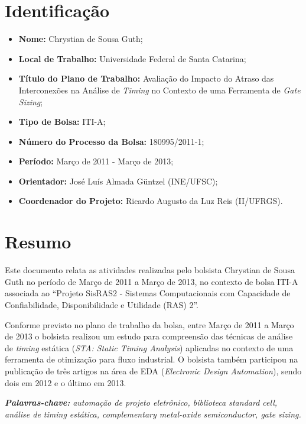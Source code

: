 \documentclass[
	12pt,				%
	openright,			%
	twoside,			%
	a4paper,			%
	english,			%
	french,				%
	spanish,			%
	brazil,				%
	]{abntex2}
\begin{document}
\section{Identificação}

\begin{itemize}
	\item \textbf{Nome:} Chrystian de Sousa Guth;
	\item \textbf{Local de Trabalho:} Universidade Federal de Santa Catarina;
	\item \textbf{Título do Plano de Trabalho:} Avaliação do Impacto do Atraso das Interconexões na Análise de \textit{Timing} no Contexto de uma Ferramenta de \textit{Gate Sizing};
	\item \textbf{Tipo de Bolsa:} ITI-A;
	\item \textbf{Número do Processo da Bolsa:} 180995/2011-1;
	\item \textbf{Período:} Março de 2011 - Março de 2013;
	\item \textbf{Orientador:} José Luís Almada Güntzel (INE/UFSC);
	\item \textbf{Coordenador do Projeto:} Ricardo Augusto da Luz Reis (II/UFRGS).
\end{itemize}

\section{Resumo}
Este documento relata as atividades realizadas pelo bolsista Chrystian de Sousa Guth no período de Março de 2011 a Março de 2013, no contexto de bolsa ITI-A associada ao ``Projeto SisRAS2 - Sistemas Computacionais com Capacidade de Confiabilidade, Disponibilidade e Utilidade (RAS) 2''.

Conforme previsto no plano de trabalho da bolsa, entre Março de 2011 a Março de 2013 o bolsista realizou um estudo para compreensão das técnicas de análise de \textit{timing} estática (\textit{STA: Static Timing Analysis}) aplicadas no contexto de uma ferramenta de otimização para fluxo industrial. O bolsista também participou na publicação de três artigos na área de EDA (\textit{Electronic Design Automation}), sendo dois em 2012 e o último em 2013.

\begin{center}
\textit{\textbf{Palavras-chave:} automação de projeto eletrônico, biblioteca standard cell, análise de timing estática, complementary metal-oxide semiconductor, gate sizing.}
\end{center}
\end{document}
